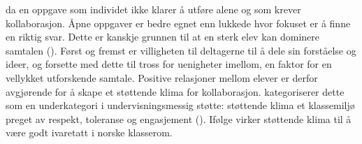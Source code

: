 \documentclass[12pt,twoside,onecolumn,norsk]{article}
\begin{document}
da en oppgave som individet ikke klarer å utføre alene og som krever kollaborasjon. Åpne 
oppgaver er bedre egnet enn lukkede hvor fokuset er å finne en riktig svar. Dette er kanskje 
grunnen til at en sterk elev kan dominere samtalen (). Først og fremst 
er villigheten til deltagerne til å dele sin forståelse og ideer, og forsette med dette til 
tross for uenigheter imellom, en faktor for en vellykket utforskende samtale. Positive 
relasjoner mellom elever er derfor avgjørende for å skape et støttende klima for kollaborasjon. 
 kategoriserer dette som en underkategori i undervisningsmessig støtte: 
støttende klima et klassemiljø preget av respekt, toleranse og engasjement 
(). Ifølge  virker støttende klima til å være godt 
ivaretatt i norske klasserom.

\newpage\null


\end{document}
